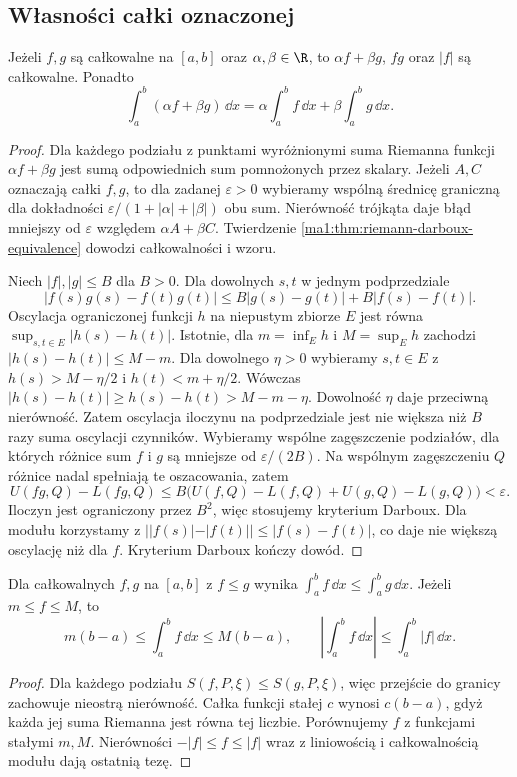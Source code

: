 \subsection{Własności całki oznaczonej}
\begin{twierdzenie}
\label{ma1:thm:riemann-algebra}
Jeżeli $f,g$ są całkowalne na $[a,b]$ oraz $\alpha,\beta\in\R$, to $\alpha f+\beta g$, $fg$ oraz $|f|$ są całkowalne. Ponadto
\[
 \int_a^b(\alpha f+\beta g)\,\dd x
 =\alpha\int_a^b f\,\dd x+\beta\int_a^b g\,\dd x.
\]
\end{twierdzenie}
\begin{proof}
Dla każdego podziału z punktami wyróżnionymi suma Riemanna funkcji $\alpha f+\beta g$ jest sumą odpowiednich sum pomnożonych przez skalary. Jeżeli $A,C$ oznaczają całki $f,g$, to dla zadanej $\varepsilon>0$ wybieramy wspólną średnicę graniczną dla dokładności $\varepsilon/(1+|\alpha|+|\beta|)$ obu sum. Nierówność trójkąta daje błąd mniejszy od $\varepsilon$ względem $\alpha A+\beta C$. Twierdzenie \ref{ma1:thm:riemann-darboux-equivalence} dowodzi całkowalności i wzoru.

Niech $|f|,|g|\le B$ dla $B>0$. Dla dowolnych $s,t$ w jednym podprzedziale
\[
 |f(s)g(s)-f(t)g(t)|\le B|g(s)-g(t)|+B|f(s)-f(t)|.
\]
Oscylacja ograniczonej funkcji $h$ na niepustym zbiorze $E$ jest równa $\sup_{s,t\in E}|h(s)-h(t)|$. Istotnie, dla $m=\inf_E h$ i $M=\sup_E h$ zachodzi $|h(s)-h(t)|\le M-m$. Dla dowolnego $\eta>0$ wybieramy $s,t\in E$ z $h(s)>M-\eta/2$ i $h(t)<m+\eta/2$. Wówczas $|h(s)-h(t)|\ge h(s)-h(t)>M-m-\eta$. Dowolność $\eta$ daje przeciwną nierówność. Zatem oscylacja iloczynu na podprzedziale jest nie większa niż $B$ razy suma oscylacji czynników. Wybieramy wspólne zagęszczenie podziałów, dla których różnice sum $f$ i $g$ są mniejsze od $\varepsilon/(2B)$. Na wspólnym zagęszczeniu $Q$ różnice nadal spełniają te oszacowania, zatem
\[
 U(fg,Q)-L(fg,Q)
 \le B\bigl(U(f,Q)-L(f,Q)+U(g,Q)-L(g,Q)\bigr)
 <\varepsilon.
\]
Iloczyn jest ograniczony przez $B^2$, więc stosujemy kryterium Darboux. Dla modułu korzystamy z $||f(s)|-|f(t)||\le |f(s)-f(t)|$, co daje nie większą oscylację niż dla $f$. Kryterium Darboux kończy dowód.
\end{proof}

\begin{twierdzenie}
\label{ma1:thm:riemann-order}
Dla całkowalnych $f,g$ na $[a,b]$ z $f\le g$ wynika $\int_a^b f\,\dd x\le\int_a^b g\,\dd x$. Jeżeli $m\le f\le M$, to
\[
 m(b-a)\le\int_a^b f\,\dd x\le M(b-a),\qquad
 \left|\int_a^b f\,\dd x\right|\le\int_a^b |f|\,\dd x.
\]
\end{twierdzenie}
\begin{proof}
Dla każdego podziału $S(f,P,\xi)\le S(g,P,\xi)$, więc przejście do granicy zachowuje nieostrą nierówność. Całka funkcji stałej $c$ wynosi $c(b-a)$, gdyż każda jej suma Riemanna jest równa tej liczbie. Porównujemy $f$ z funkcjami stałymi $m,M$. Nierówności $-|f|\le f\le |f|$ wraz z liniowością i całkowalnością modułu dają ostatnią tezę.
\end{proof}

